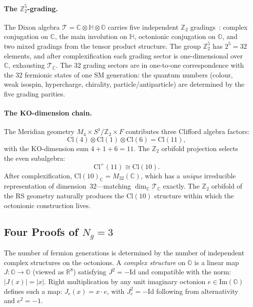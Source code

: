 \paragraph{The $\mathbb{Z}_2^5$-grading.}
The Dixon algebra $\mathcal{T} = \mathbb{C} \otimes \mathbb{H} \otimes \mathbb{O}$ carries five independent $\mathbb{Z}_2$ gradings~\cite{ch4:Furey2025}: complex conjugation on $\mathbb{C}$, the main involution on $\mathbb{H}$, octonionic conjugation on $\mathbb{O}$, and two mixed gradings from the tensor product structure. The group $\mathbb{Z}_2^5$ has $2^5 = 32$ elements, and after complexification each grading sector is one-dimensional over $\mathbb{C}$, exhausting $\mathcal{T}_{\mathbb{C}}$. The 32 grading sectors are in one-to-one correspondence with the 32 fermionic states of one SM generation: the quantum numbers (colour, weak isospin, hypercharge, chirality, particle/antiparticle) are determined by the five grading parities.

\paragraph{The KO-dimension chain.}
The Meridian geometry $M_4 \times S^1/\mathbb{Z}_2 \times F$ contributes three Clifford algebra factors:
\begin{equation}
  \mathrm{Cl}(4) \otimes \mathrm{Cl}(1) \otimes \mathrm{Cl}(6) = \mathrm{Cl}(11),
  \label{eq:4-78}
\end{equation}
with the KO-dimension sum $4 + 1 + 6 = 11$. The $\mathbb{Z}_2$ orbifold projection selects the even subalgebra:
\begin{equation}
  \mathrm{Cl}^+(11) \cong \mathrm{Cl}(10).
  \label{eq:4-79}
\end{equation}
After complexification, $\mathrm{Cl}(10)_{\mathbb{C}} = M_{32}(\mathbb{C})$, which has a \emph{unique} irreducible representation of dimension~32---matching $\dim_{\mathbb{C}} \mathcal{T}_{\mathbb{C}}$ exactly. The $\mathbb{Z}_2$ orbifold of the RS geometry naturally produces the $\mathrm{Cl}(10)$ structure within which the octonionic construction lives.


\subsection{Four Proofs of \texorpdfstring{$N_g = 3$}{Ng = 3}}
\label{sec:4-ng-proofs}

The number of fermion generations is determined by the number of independent complex structures on the octonions. A \emph{complex structure} on $\mathbb{O}$ is a linear map $J\colon \mathbb{O} \to \mathbb{O}$ (viewed as $\mathbb{R}^8$) satisfying $J^2 = -\mathrm{Id}$ and compatible with the norm: $|J(x)| = |x|$. Right multiplication by any unit imaginary octonion $e \in \mathrm{Im}(\mathbb{O})$ defines such a map: $J_e(x) = x \cdot e$, with $J_e^2 = -\mathrm{Id}$ following from alternativity and $e^2 = -1$.


